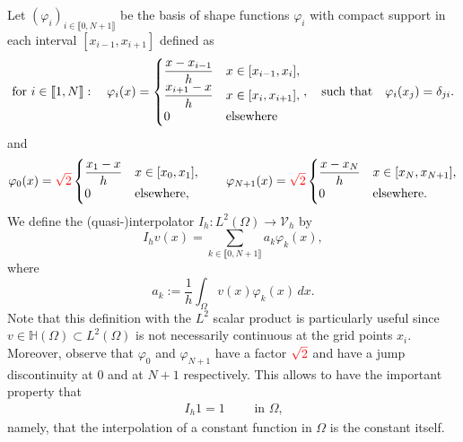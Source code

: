 \documentclass[11 pt]{article}
\newcommand\inter[1]{\llbracket #1\rrbracket}
\numberwithin{equation}{section}
\newcommand{\B}[1]{{\color{red} #1}}  %
\begin{document}
Let $(\varphi_i)_{i\in\inter{0,N+1}}$ be the basis of shape functions $\varphi_i$ with compact support in each interval $[x_{i-1},x_{i+1}]$ defined as
%
\begin{align}\label{eq:def_basis}
    \textnormal{for $i\in\inter{1,N}$}:\quad \varphi_i(x)=\begin{cases}
        \displaystyle \frac{x-x_{i-1}}{h} &x\in[x_{i-1},x_i], \\
        \displaystyle \frac{x_{i+1}-x}{h} &x\in [x_i,x_{i+1}], \\
        0 &\textnormal{elsewhere}
    \end{cases}, \quad\textnormal{such that}\quad \varphi_i(x_j)=\delta_{ji}.
\end{align}
and
%
\begin{align}\label{eq:def_basis_ext}
    \varphi_0(x)=\B{\sqrt{2}}\begin{cases}
        \displaystyle \frac{x_{1}-x}{h} &x\in [x_0,x_{1}], \\
        0 &\textnormal{elsewhere},
    \end{cases} \qquad \varphi_{N+1}(x)=\B{\sqrt{2}}\begin{cases}
        \displaystyle \frac{x-x_{N}}{h} &x\in[x_{N},x_{N+1}], \\
        0 &\textnormal{elsewhere.}
    \end{cases}
\end{align}
%
We define the (quasi-)interpolator $I_h:L^2(\Omega)\to \mathcal V_h$ by
%
\begin{equation}\label{eq:interpolator}
I_h v(x)=\sum_{k\in\inter{0,N+1}}a_k \varphi_k(x),
\end{equation}
where
%
\begin{equation}\label{eq:def_coeff_ak}
  a_k:=\frac{1}{h}\int_{\Omega}v(x)\varphi_k(x)\,dx.
\end{equation}
%
Note that this definition with the $L^2$ scalar product is particularly useful since $v\in\mathbb H(\Omega)\subset L^2(\Omega)$ is not necessarily continuous at the grid points $x_i$.  Moreover, observe that $\varphi_0$ and $\varphi_{N+1}$ have a factor $\B{\sqrt{2}}$ and have a jump discontinuity at $0$ and at $N+1$ respectively.  This allows to have the important property that
\begin{align}\label{Ihc}
I_h 1 = 1\qquad \text{ in $\Omega$,}
\end{align}
namely, that the interpolation of a constant function in $\Omega$ is the constant itself.
\end{document}
